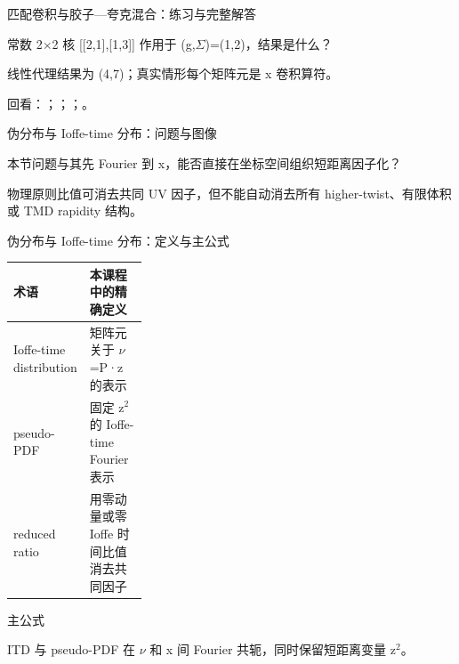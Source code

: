 \begin{frame}[t]{匹配卷积与胶子—夸克混合：练习与完整解答}
\footnotesize
\begin{block}{}常数 2\ensuremath{\times}2 核 [[2,1],[1,3]] 作用于 (g,\ensuremath{\Sigma})=(1,2)，结果是什么？\end{block}
\begin{exampleblock}{}线性代理结果为 (4,7)；真实情形每个矩阵元是 x 卷积算符。\end{exampleblock}
\vfill
\scriptsize 回看：；；；。
\end{frame}

\begin{frame}[t]{伪分布与 Ioffe-time 分布：问题与图像}
\footnotesize
\begin{block}{本节问题}与其先 Fourier 到 x，能否直接在坐标空间组织短距离因子化？\end{block}
\begin{block}{物理原则}\quad 比值可消去共同 UV 因子，但不能自动消去所有 higher-twist、有限体积或 TMD rapidity 结构。\end{block}
\end{frame}

\begin{frame}[t]{伪分布与 Ioffe-time 分布：定义与主公式}
\footnotesize\begin{tabularx}{\linewidth}{p{0.30\linewidth}Y}
\toprule 术语 & 本课程中的精确定义\\\midrule
{} Ioffe-time distribution & 矩阵元关于 \ensuremath{\nu}=P·z 的表示\\
 pseudo-PDF & 固定 z\ensuremath{^{2}} 的 Ioffe-time Fourier 表示\\
 reduced ratio & 用零动量或零 Ioffe 时间比值消去共同因子\\
\bottomrule\end{tabularx}\vspace{0.15cm}
\begin{block}{ 主公式}\centering{}\end{block}
ITD 与 pseudo-PDF 在 \ensuremath{\nu} 和 x 间 Fourier 共轭，同时保留短距离变量 z\ensuremath{^{2}}。
\end{frame}

